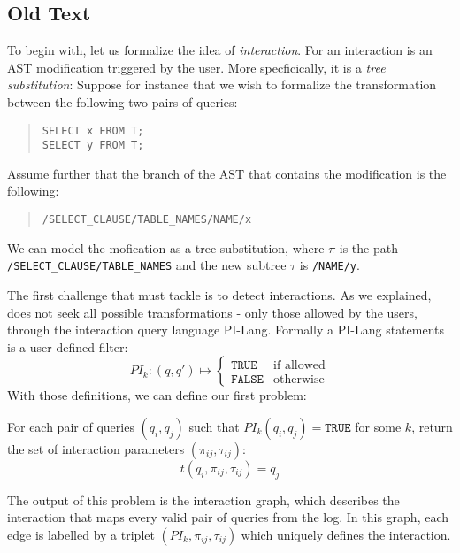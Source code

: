 

  \subsection{Old Text}
  To begin with, let us formalize the idea of \emph{interaction}. For \sys{} an interaction is an AST modification triggered by the user. More specficically, it is a \emph{tree substitution}:
  Suppose for instance that we wish to formalize the transformation between the following two pairs of queries:
  \begin{quote}
  \texttt{SELECT x FROM T;}\\
  \texttt{SELECT y FROM T;}
  \end{quote}
  Assume further that the branch of the AST that contains the modification is the following:
  \begin{quote}
  \texttt{/SELECT\_CLAUSE/TABLE\_NAMES/NAME/x}
  \end{quote}
  We can model the mofication as a tree substitution, where $\pi$ is the path \texttt{/SELECT\_CLAUSE/TABLE\_NAMES} and the new subtree $\tau$ is \texttt{/NAME/y}.

  The first challenge that \sys{} must tackle is to detect interactions. As we explained, \sys{} does not seek all possible transformations - only those allowed by the users, through the interaction query language PI-Lang. Formally a PI-Lang statements is a user defined filter:
  $$
  PI_k:(q, q') \mapsto   \begin{cases}
        \texttt{TRUE} & \text{if allowed}\\
        \texttt{FALSE} & \text{otherwise}
  \end{cases}
  $$
  With those definitions, we can define our first problem:
  \begin{problem}
  For each pair of queries $(q_i, q_j)$  such that $PI_k(q_{i},q_{j}) = \texttt{TRUE}$ for some $k$, return the set of interaction parameters $(\pi_{ij}, \tau_{ij})$:
  $$
  t(q_{i}, \pi_{ij},\tau_{ij}) = q_j
  $$
  \end{problem}
  The output of this problem is the interaction graph, which describes the interaction that maps every valid pair of queries from the log. In this graph, each edge is labelled by a triplet $(PI_k, \pi_{ij}, \tau_{ij})$ which uniquely defines the interaction.

